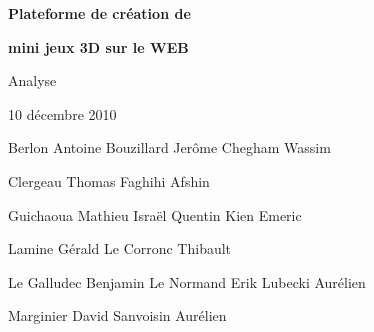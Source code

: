 \documentclass[a4paper,10pt]{article}
\begin{document}
\thispagestyle{empty} 

\vspace{4cm}

\begin{center}
 \textbf{\huge Plateforme de création de}
\end{center}

\begin{center}
 \textbf{\huge mini jeux 3D sur le WEB}
\end{center}

\vspace{0.5cm}

\begin{center}
{\LARGE Analyse}
\end{center}

\vspace{2cm}

\Large
\begin{center}
 10 décembre 2010
\end{center}

\vspace{2cm}


\noindent
\hspace{0.2cm} Berlon Antoine \hspace{1.9cm} Bouzillard Jerôme \hspace{1.9cm} Chegham Wassim

\vspace{0.2cm}
\hspace{2.5cm} Clergeau Thomas \hspace{2cm} Faghihi Afshin

\vspace{0.2cm}
\noindent
Guichaoua Mathieu \hspace{1.6cm} Israël Quentin \hspace{2.9cm} Kien Emeric

\vspace{0.2cm}
\hspace{2.7cm} Lamine Gérald \hspace{1.8cm} Le Corronc Thibault

\vspace{0.2cm}
\noindent
 Le Galludec Benjamin \hspace{1cm} Le Normand Erik \hspace{1.7cm} Lubecki Aurélien 

\vspace{0.2cm}
\hspace{2.5cm} Marginier David \hspace{2cm} Sanvoisin Aurélien
\end{document}

